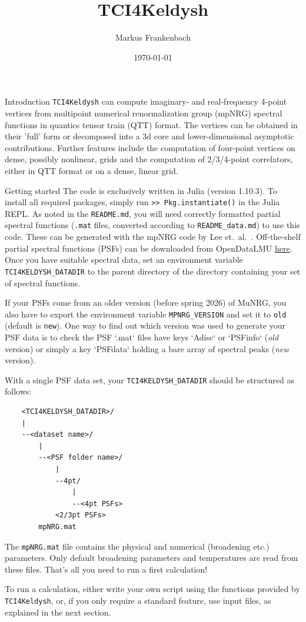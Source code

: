 \documentclass[12pt]{article}
\title{TCI4Keldysh}
\author{Markus Frankenbach}
\date{\today}
\begin{document}
\maketitle

\begin{section}{Introduction}
\texttt{TCI4Keldysh} can compute imaginary- and real-frequency 4-point vertices from multipoint numerical renormalization group (mpNRG) spectral functions in quantics tensor train (QTT) format.
The vertices can be obtained in their 'full' form or decomposed into a 3d core and lower-dimensional asymptotic contributions.
Further features include the computation of four-point vertices on dense, possibly nonlinear, grids and the computation of 2/3/4-point correlators, either
in QTT format or on a dense, linear grid.
\end{section}

\begin{section}{Getting started}
\label{sec:getting_started}
The code is exclusively written in Julia (version 1.10.3). To install all required packages,
simply run \texttt{>> Pkg.instantiate()} in the Julia REPL.
As noted in the \texttt{README.md}, you will need correctly formatted partial spectral functions (\texttt{.mat} files, converted according to \texttt{README\_data.md}) to use this code.
These can be generated with the mpNRG code by Lee et.~al.\ \cite{Lee2021}.
Off-the-shelf partial spectral functions (PSFs) can be downloaded from OpenDataLMU \href{https://doi.org/10.5282/ubm/data.613}{here}.
Once you have suitable spectral data, set an environment variable \texttt{TCI4KELDYSH\_DATADIR} to
the parent directory of the directory containing your set of spectral functions.

If your PSFs come from an older version (before spring 2026) of MuNRG, you also have to export the environment variable \texttt{MPNRG\_VERSION} and set it to \texttt{old} (default is \texttt{new}).
One way to find out which version was used to generate your PSF data is to check the PSF `.mat` files have keys `Adisc` or `PSFinfo` (\textit{old} version) or simply a key `PSFdata` holding a bare array of spectral peaks (\textit{new} version).

With a single PSF data set, your \texttt{TCI4KELDYSH\_DATADIR} should be structured as follows:
\begin{verbatim}
    <TCI4KELDYSH_DATADIR>/
    |
    --<dataset name>/
        |
        --<PSF folder name>/
            |
            --4pt/
                |
                --<4pt PSFs>
            <2/3pt PSFs>
        mpNRG.mat
\end{verbatim}
The \texttt{mpNRG.mat} file contains the physical and numerical (broadening etc.) parameters.
Only default broadening parameters and temperatures are read from these files.
That's all you need to run a first calculation! 

To run a calculation, either write your own script using
the functions provided by \texttt{TCI4Keldysh}, or, if you only require a standard feature,
use input files, as explained in the next section.
\end{section}
\end{document}
